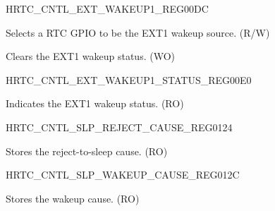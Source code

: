 \begin{register}{H}{RTC\_CNTL\_EXT\_WAKEUP1\_REG}{\hexprefix{}00DC}\label{regdesc:RTCCNTLEXTWAKEUP1REG}
%
%
%
\regnewline%
\begin{regdesc}\begin{reglist}
\label{fielddesc:RTCCNTLEXTWAKEUP1SEL}\item [RTC\_CNTL\_EXT\_WAKEUP1\_SEL] Selects a RTC GPIO to be the EXT1 wakeup source. (R/W)
\label{fielddesc:RTCCNTLEXTWAKEUP1STATUSCLR}\item [RTC\_CNTL\_EXT\_WAKEUP1\_STATUS\_CLR] Clears the EXT1 wakeup status. (WO)
\end{reglist}\end{regdesc}
\end{register}


\begin{register}{H}{RTC\_CNTL\_EXT\_WAKEUP1\_STATUS\_REG}{\hexprefix{}00E0}\label{regdesc:RTCCNTLEXTWAKEUP1STATUSREG}
%
%
\regnewline%
\begin{regdesc}\begin{reglist}
\label{fielddesc:RTCCNTLEXTWAKEUP1STATUS}\item [RTC\_CNTL\_EXT\_WAKEUP1\_STATUS] Indicates the EXT1 wakeup status. (RO)
\end{reglist}\end{regdesc}
\end{register}


\begin{register}{H}{RTC\_CNTL\_SLP\_REJECT\_CAUSE\_REG}{\hexprefix{}0124}\label{regdesc:RTCCNTLSLPREJECTCAUSEREG}
%
%
\regnewline%
\begin{regdesc}\begin{reglist}
\label{fielddesc:RTCCNTLREJECTCAUSE}\item [RTC\_CNTL\_REJECT\_CAUSE] Stores the reject-to-sleep cause. (RO)
\end{reglist}\end{regdesc}
\end{register}


\begin{register}{H}{RTC\_CNTL\_SLP\_WAKEUP\_CAUSE\_REG}{\hexprefix{}012C}\label{regdesc:RTCCNTLSLPWAKEUPCAUSEREG}
%
%
\regnewline%
\begin{regdesc}\begin{reglist}
\label{fielddesc:RTCCNTLWAKEUPCAUSE}\item [RTC\_CNTL\_WAKEUP\_CAUSE] Stores the wakeup cause. (RO)
\end{reglist}\end{regdesc}
\end{register}


